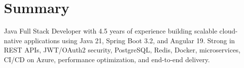 \section{Summary}
\small{
Java Full Stack Developer with 4.5 years of experience building scalable cloud-native applications using Java 21, Spring Boot 3.2, and Angular 19. Strong in REST APIs, JWT/OAuth2 security, PostgreSQL, Redis, Docker, microservices, CI/CD on Azure, performance optimization, and end-to-end delivery.
}
